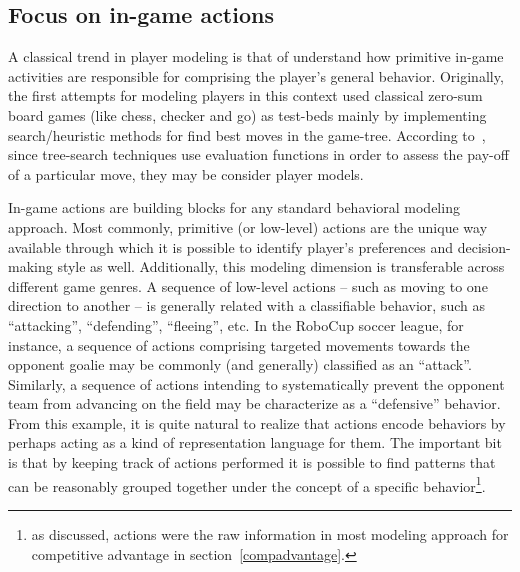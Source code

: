 \subsection{Focus on in-game actions}
A classical trend in player modeling is that of understand how primitive in-game activities are responsible for comprising the player's general behavior. Originally, the first attempts for modeling players in this context used classical zero-sum board games (like chess, checker and go) as test-beds mainly by implementing search/heuristic methods for find best moves in the game-tree. According to~\cite{bakkes2012player}, since tree-search techniques use evaluation functions in order to assess the pay-off of a particular move, they may be consider player models.

In-game actions are building blocks for any standard behavioral modeling approach. Most commonly, primitive (or low-level) actions are the unique way available through which it is possible to identify player's preferences and decision-making style as well. Additionally, this modeling dimension is transferable across different game genres. A sequence of low-level actions -- such as moving to one direction to another -- is generally related with a classifiable behavior, such as ``attacking'', ``defending'', ``fleeing'', etc. In the RoboCup soccer league, for instance, a sequence of actions comprising targeted movements towards the opponent goalie may be commonly (and generally) classified as an ``attack''. Similarly, a sequence of actions intending to systematically prevent the opponent team from advancing on the field may be characterize as a ``defensive'' behavior. From this example, it is quite natural to realize that actions encode behaviors by perhaps acting as a kind of representation language for them. The important bit is that by keeping track of actions performed it is possible to find patterns that can be reasonably grouped together under the concept of a specific behavior\footnote{as discussed, actions were the raw information in most modeling approach for competitive advantage in section~\ref{compadvantage}.}.


